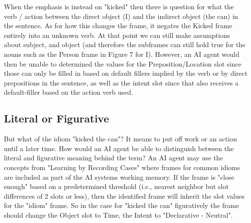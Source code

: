 \documentclass[
	letterpaper, %
]{jdf}
\begin{document}
When the emphasis is instead on "kicked" then there is question for what the verb / action between the direct object (I) and the indirect object (the can) in the sentence. As for how this changes the frame, it negates the Kicked frame entirely into an unknown verb. At that point we can still make assumptions about subject, and object (and therefore the subframes can still hold true for the nouns such as the Person frame in Figure 7 for I). However, an AI agent would then be unable to determined the values for the Preposition/Location slot since those can only be filled in based on default fillers implied by the verb or by direct prepositions in the sentence, as well as the intent slot since that also receives a default-filler based on the action verb used.

\subsection{Literal or Figurative}
But what of the idiom "kicked the can"? It means to put off work or an action until a later time. How would an AI agent be able to distinguish between the literal and figurative meaning behind the term? An AI agent may use the concepts from "Learning by Recording Cases" where frames for common idioms are included as part of the AI systems working memory. If the frame is "close enough" based on a predetermined threshold (i.e., nearest neighbor but slot differences of 2 slots or less), then the identified frame will inherit the slot values for the "idiom" frame. So in the case for "kicked the can" figuratively the frame should change the Object slot to Time, the Intent to "Declarative - Neutral".
\end{document}
